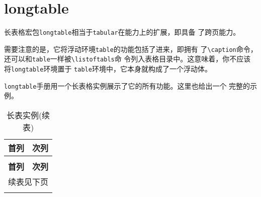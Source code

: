 \documentclass{article}
\begin{document}
\section{longtable}

长表格宏包\texttt{longtable}相当于\texttt{tabular}在能力上的扩展，即具备
了跨页能力。

需要注意的是，它将浮动环境\texttt{table}的功能包括了进来，即拥有
了\verb!\caption!命令，还可以和\texttt{table}一样被\verb!\listoftabls!命
令列入表格目录中。这意味着，你不应该将\texttt{longtable}环境置于
\texttt{table}环境中，它本身就构成了一个浮动体。

\texttt{longtable}手册用一个长表格实例展示了它的所有功能。这里也给出一个
完整的示例。

\begin{longtable}{@{*}r||p{2in}@{*}}

  \caption{长表实例} \\
  \toprule
  首列    &  次列  \\
  \midrule
  \endfirsthead

  \caption{长表实例(续表)} \\
  \toprule
  \textbf{首列}    &  \textbf{次列}  \\
  \midrule
  \endhead

  \midrule
  \multicolumn{2}{r}{续表见下页}\\%
  \endfoot
  
  \bottomrule
  \endlastfoot


\end{longtable}
\end{document}
